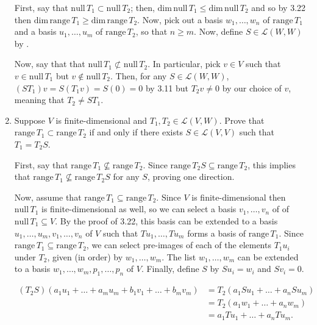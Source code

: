 \documentclass{book}
\begin{document}
\begin{enumerate}
First, say that \(\textrm{null} \, T_1 \subset \textrm{null} \, T_2\); then, \(\textrm{dim} \, \textrm{null} \, T_1 \leq \textrm{dim} \, \textrm{null} \, T_2\) and so by 3.22 then \(\textrm{dim} \, \textrm{range} \, T_1 \geq \textrm{dim} \, \textrm{range} \, T_2\).  Now, pick out a basis \(w_1,\dots,w_n\) of \(\textrm{range} \, T_1\) and a basis \(u_1,\dots,u_m\) of \(\textrm{range} \, T_2\), so that \(n \geq m\).  Now, define \(S \in \mathcal{L}(W,W)\) by .

Now, say that that \(\textrm{null} \, T_1 \not\subset \textrm{null} \, T_2\).  In particular, pick \(v \in V\) such that \(v \in \textrm{null} \, T_1\) but \(v \notin \textrm{null} \, T_2\).  Then, for any \(S \in \mathcal{L}(W,W)\), \((ST_1)v=S(T_1v)=S(0)=0\) by 3.11 but \(T_2v \neq 0\) by our choice of \(v\), meaning that \(T_2 \neq ST_1\).

\item Suppose \(V\) is finite-dimensional and \(T_1,T_2 \in \mathcal{L}(V,W)\).  Prove that \(\textrm{range} \, T_1 \subset \textrm{range} \, T_2\) if and only if there exists \(S \in \mathcal{L}(V,V)\) such that \(T_1=T_2S\).

First, say that \(\text{range} \, T_1 \nsubseteq \text{range} \, T_2\).  Since \(\text{range} \, T_2S \subseteq \text{range} \, T_2\), this implies that \(\text{range} \, T_1 \nsubseteq \text{range} \, T_2S\) for any \(S\), proving one direction.

Now, assume that \(\text{range} \, T_1 \subseteq \text{range} \, T_2\).  Since \(V\) is finite-dimensional then \(\text{null} \, T_1\) is finite-dimensional as well, so we can select a basis \(v_1,\dots,v_n\) of of \(\text{null} \, T_1 \subseteq V\).  By the proof of 3.22, this basis can be extended to a basis \(u_1,\dots,u_m,v_1,\dots,v_n\) of \(V\) such that \(Tu_1,\dots,Tu_m\) forms a basis of \(\text{range} \, T_1\).  Since \(\text{range} \, T_1 \subseteq \text{range} \, T_2\), we can select pre-images of each of the elements \(T_1u_i\) under \(T_2\), given (in order) by \(w_1,\dots,w_m\).  The list \(w_1,\dots,w_m\) can be extended to a basis \(w_1,\dots,w_m,p_1,\dots,p_n\) of \(V\). Finally, define \(S\) by \(Su_i = w_i\) and \(Sv_i=0\).

\begin{equation*}
    \begin{split}
        (T_2S)(a_1u_1+\dots+a_mu_m+b_1v_1+\dots+b_mv_m) &= T_2(a_1Su_1+\dots+a_nSu_m) \\
        &= T_2(a_1w_1+\dots+a_nw_m) \\
        &= a_1Tu_1+\dots+a_nTu_m.
    \end{split}
\end{equation*}


\end{enumerate}
\end{document}
